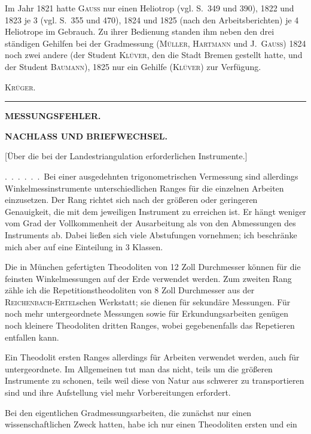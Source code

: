 Im Jahr 1821 hatte \textsc{Gauss} nur einen Heliotrop (vgl. S.~349 und 390), 1822 und 1823 je 3 (vgl.
S.~355 und 470), 1824 und 1825 (nach den Arbeitsberichten) je 4 Heliotrope im Gebrauch. Zu ihrer Bedienung
standen ihm neben den drei ständigen Gehilfen bei der Gradmessung (\textsc{Müller}, \textsc{Hartmann} und
\textsc{J.~Gauss}) 1824 noch zwei andere (der Student \textsc{Klüver}, den die Stadt Bremen gestellt hatte, und der Student
\textsc{Baumann}), 1825 nur ein Gehilfe (\textsc{Klüver}) zur Verfügung.
\par\hfill\textsc{Krüger.}\par\endgroup
\vspace{20mm}
\begin{center}\rule{40mm}{.4pt}\end{center}

\clearpage
\vspace*{40mm}
\begin{center}{\Large\bfseries MESSUNGSFEHLER.}\end{center}
\clearpage\null\clearpage
\vspace*{14mm}
\begin{center}
{\Large\bfseries NACHLASS UND BRIEFWECHSEL.}\par\vspace{10mm}
[Über die bei der Landestriangulation erforderlichen Instrumente.]
\end{center}
.\ .\ .\ .\ .\ .\ Bei einer ausgedehnten trigonometrischen Vermessung sind allerdings
Winkelmessinstrumente unterschiedlichen Ranges für die einzelnen Arbeiten
einzusetzen. Der Rang richtet sich nach der größeren oder geringeren
Genauigkeit, die mit dem jeweiligen Instrument zu erreichen ist. Er hängt
weniger vom Grad der Vollkommenheit der Ausarbeitung als von den Abmessungen
des Instruments ab. Dabei ließen sich viele Abstufungen vornehmen; ich
beschränke mich aber auf eine Einteilung in 3 Klassen.

Die in München gefertigten Theodoliten von 12 Zoll Durchmesser können
für die feinsten Winkelmessungen auf der Erde verwendet werden. Zum zweiten
Rang zähle ich die Repetitionstheodoliten von 8 Zoll Durchmesser aus der
\textsc{Reichenbach-Ertel}schen Werkstatt; sie dienen für sekundäre Messungen.
Für noch mehr untergeordnete Messungen sowie für Erkundungsarbeiten genügen
noch kleinere Theodoliten dritten Ranges, wobei gegebenenfalls das Repetieren
entfallen kann.

Ein Theodolit ersten Ranges  allerdings für  Arbeiten
verwendet werden, auch für untergeordnete. Im Allgemeinen tut man das nicht,
teils um die größeren Instrumente zu schonen, teils weil diese von Natur aus
schwerer zu transportieren sind und ihre Aufstellung viel mehr Vorbereitungen
erfordert.

Bei den eigentlichen Gradmessungsarbeiten, die zunächst nur einen wissenschaftlichen
Zweck hatten, habe ich nur einen Theodoliten ersten und ein
